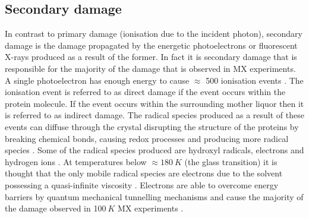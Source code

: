     \subsection{Secondary damage}
    \label{sub:Secondary damage}
        In contrast to primary damage (ionisation due to the incident photon), secondary damage is the damage propagated by the energetic photoelectrons or fluorescent X-rays produced as a result of the former.
        In fact it is secondary damage that is responsible for the majority of the damage that is observed in MX experiments.
        A single photoelectron has enough energy to cause $\approx$ 500 ionisation events \cite{o2002physical}. The ionisation event is referred to as direct damage if the event occurs within the protein molecule.
        If the event occurs within the surrounding mother liquor then it is referred to as indirect damage.
        The radical species produced as a result of these events can diffuse through the crystal disrupting the structure of the proteins by breaking chemical bonds, causing redox processes and producing more radical species \cite{meents2010}.
		Some of the radical species produced are hydroxyl radicals, electrons and hydrogen ions \cite{garman2010}.
        At temperatures below $\approx 180\ K$ (the glass transition) it is thought that the only mobile radical species are electrons \cite{jones1987structure} due to the solvent possessing a quasi-infinite viscosity \cite{weik2001specific}.
		Electrons are able to overcome energy barriers by quantum mechanical tunnelling mechanisms \cite{garman2009radiation} and cause the majority of the damage observed in 100$\ K$ MX experiments \cite{garman2010}.

